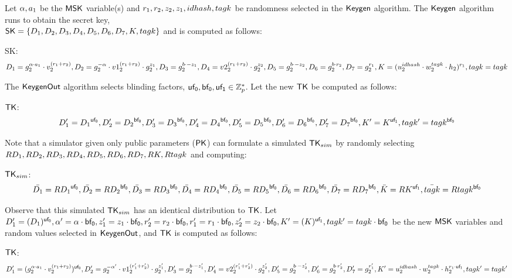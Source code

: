 \documentclass[11pt]{article}
\begin{document}
Let $\listofmskvalues$ be the $\MSK$ variable(s) and $\listofrandomvalues$ be randomness selected in the $\Keygen$ algorithm. The $\Keygen$ algorithm runs to obtain the secret key, \\ $\SK = \{\secretkey\}$ and is computed as follows:

\begin{description}
\item {\sf SK}: \begin{multline*}  \originalkey \end{multline*}
\end{description}

\noindent
The $\KeygenOut$ algorithm selects blinding factors, $\listofbfs \in \Zp^*$. Let the new $\TK$ be computed as follows:

\begin{description}
\item {\sf $\TK$}: \begin{multline*}  \transformkey \end{multline*}
\end{description}

\noindent
Note that a simulator given only public parameters ($\PK$) can formulate a simulated $\pseudokey$ by randomly selecting $\randomsecretkeys$ and computing: 

\begin{description}
\item {\sf $\pseudokey$}: \begin{multline*}  \pseudotransformkey \end{multline*}
\end{description}

Observe that this simulated $\pseudokey$ has an identical distribution to $\TK$.  Let $\keydefinitions$ be the new $\MSK$ variables and random values selected in $\KeygenOut$, and $\TK$ is computed as follows:

\begin{description}
\item {\sf $\TK$}: \begin{multline*}  \expandedtransformkey \end{multline*} 
\end{description}

%
%
%
%
\end{document}
